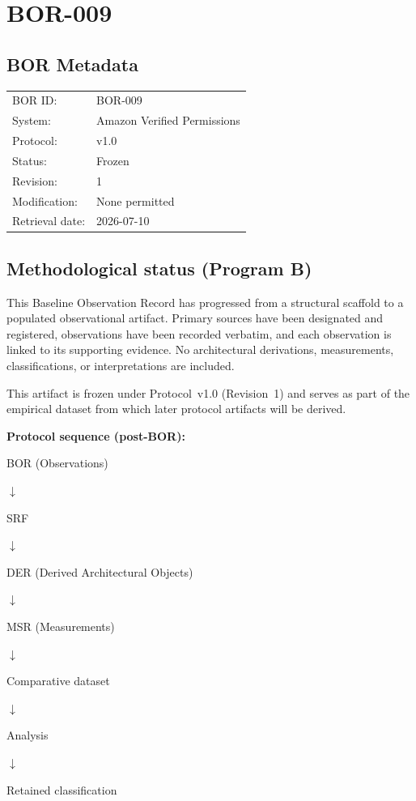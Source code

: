 \documentclass{article}
\begin{document}
\newpage
\section*{BOR-009}

\subsection*{BOR Metadata}
\begin{tabular}{@{}ll@{}}
\toprule
BOR ID: & BOR-009\\
System: & Amazon Verified Permissions\\
Protocol: & v1.0\\
Status: & Frozen\\
Revision: & 1\\
Modification: & None permitted\\
Retrieval date: & 2026-07-10\\
\bottomrule
\end{tabular}

\subsection*{Methodological status (Program B)}

This Baseline Observation Record has progressed from a structural scaffold to a populated observational artifact. Primary sources have been designated and registered, observations have been recorded verbatim, and each observation is linked to its supporting evidence. No architectural derivations, measurements, classifications, or interpretations are included.

This artifact is frozen under Protocol~v1.0 (Revision~1) and serves as part of the empirical dataset from which later protocol artifacts will be derived.

\noindent\textbf{Protocol sequence (post-BOR):}
\begin{center}
BOR (Observations)\par
$\downarrow$\par
SRF\par
$\downarrow$\par
DER (Derived Architectural Objects)\par
$\downarrow$\par
MSR (Measurements)\par
$\downarrow$\par
Comparative dataset\par
$\downarrow$\par
Analysis\par
$\downarrow$\par
Retained classification
\end{center}
\end{document}
